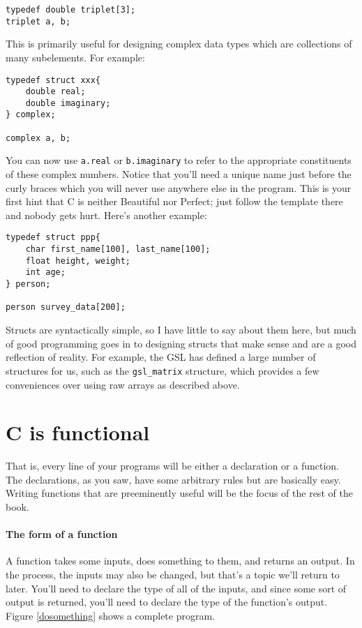 \documentclass[12pt]{article}
\makeatletter
\def\ttindex#1{\index{#1@{\tt #1}}}
\makeatother
\begin{document}
\begin{verbatim}
typedef double triplet[3];
triplet	a, b;
\end{verbatim}

This is primarily useful for designing
complex data types which are collections of many subelements. \ttindex{struct}
For example:

\begin{verbatim}
typedef struct xxx{
    double real;
    double imaginary;
} complex;

complex a, b;
\end{verbatim}

You can now use {\tt a.real} or {\tt b.imaginary} to refer to the
appropriate constituents of these complex numbers. Notice that you'll
need a unique name just before the curly braces which you will never
use anywhere else in the program. This is your first hint that C is
neither Beautiful nor Perfect; just follow the template there and nobody
gets hurt. Here's another example:

\begin{verbatim}
typedef struct ppp{
    char first_name[100], last_name[100];
    float height, weight;
    int age;
} person;

person survey_data[200];
\end{verbatim}

Structs are syntactically simple, so I have little to say about them here,
but much of good programming goes in to designing structs that make sense
and are a good reflection of reality.  For example, the GSL has defined
a large number of structures for us, such as the {\tt gsl\_matrix}
structure, which provides a few conveniences over using raw arrays as
described above.

\section{C is functional}

That is, every line of your programs will be either a declaration or a
function. The declarations, as you saw, have some arbitrary rules but
are basically easy.  Writing functions that are preeminently useful will
be the focus of the rest of the book.

\paragraph{The form of a function}

A function takes some inputs, does something to them, and returns an
output. In the process, the inputs may also be changed, but that's a
topic we'll return to later.  You'll need to declare the type of all of
the inputs, and since some sort of output is returned, you'll need to
declare the type of the function's output. Figure \ref{dosomething} shows a complete program.
\end{document}
